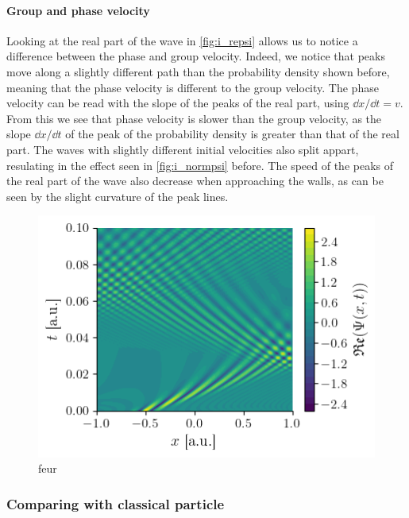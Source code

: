 \paragraph{Group and phase velocity} Looking at the real part of the wave in \autoref{fig:i_repsi} allows us to notice a difference between the phase and group velocity. Indeed, we notice that peaks move along a slightly different path than the probability density shown before, meaning that the phase velocity is different to the group velocity. The phase velocity can be read with the slope of the peaks of the real part, using \(\dd x / \dd t = v\). From this we see that phase velocity is slower than the group velocity, as the slope \(\dd x / \dd t\) of the peak of the probability density is greater than that of the real part. The waves with slightly different initial velocities also split appart, resulating in the effect seen in \autoref{fig:i_normpsi} before. The speed of the peaks of the real part of the wave also decrease when approaching the walls, as can be seen by the slight curvature of the peak lines.

\begin{figure}[h]
    \centering
    \includegraphics[width=0.6\linewidth]{figures/i_repsi.png}
    \caption{feur}
    \label{fig:i_repsi}
\end{figure}

\subsubsection{Comparing with classical particle}

